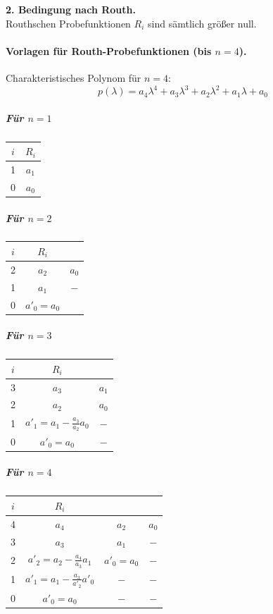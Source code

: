 \documentclass[12pt]{article}
\begin{document}
\noindent\textbf{2. Bedingung nach Routh.}\\
Routhschen Probefunktionen \(R_i\) sind sämtlich größer null.
\paragraph{Vorlagen für Routh-Probefunktionen (bis \(n=4\)).}
{\small
\setlength{\tabcolsep}{3pt}
\renewcommand{\arraystretch}{1.1}
\noindent Charakteristisches Polynom für \(n=4\):
\[
p(\lambda)=a_4\lambda^4+a_3\lambda^3+a_2\lambda^2+a_1\lambda+a_0
\]
\subparagraph*{Für \(n=1\)}
\begin{tabular}{|c||c|}
\hline
\(i\) & \(R_i\)\\
\hline
1 & \(a_1\)\\
\hline
0 & \(a_0\)\\
\hline
\end{tabular}

\subparagraph*{Für \(n=2\)}
\begin{tabular}{|c||c|c|}
\hline
\(i\) & \(R_i\) &\\
\hline
2 &  \(a_2\) & \(a_0\)\\
\hline
1 & \(a_1\) & \(-\)\\
\hline
0 & \(a'_0 = a_0\) &\\
\hline
\end{tabular}

\subparagraph*{Für \(n=3\)}
\begin{tabular}{|c||c|c|}
\hline
\(i\) & \(R_i\) &\\
\hline
3 & \(a_3\) & \(a_1\)\\
\hline
2 & \(a_2\) & \(a_0\)\\
\hline
1 & \(a'_1= a_1 - \frac{a_3}{a_2} a_0\)  & \(-\)\\
\hline
0 & \(a'_0 = a_0\) & \(-\)\\
\hline
\end{tabular}

\subparagraph*{Für \(n=4\)}
\begin{tabular}{|c||c|c|c|}
\hline
\(i\) & \(R_i\) & & \\
\hline
4 & \(a_4\) & \(a_2\) & \(a_0\)\\
\hline
3 & \(a_3\) & \(a_1\) & \(-\)\\
\hline
2 & \(a'_2= a_2 - \frac{a_4}{a_3} a_1\) & \(a'_0= a_0\) & \(-\)\\
\hline
1 & \(a'_1= a_1 - \frac{a_3}{a'_2} a'_0\)  & \(-\) & \(-\)\\
\hline
0 & \(a'_0 = a_0\) & \(-\) & \(-\)\\
\hline
\end{tabular}
}
\end{document}
